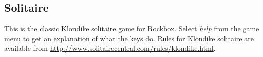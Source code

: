 \subsection{Solitaire}

This is the classic Klondike solitaire game
for Rockbox.  Select \emph{help} from the game menu to get an
explanation of what the keys do.  Rules for Klondike solitaire are
available from \url{http://www.solitairecentral.com/rules/klondike.html}.


